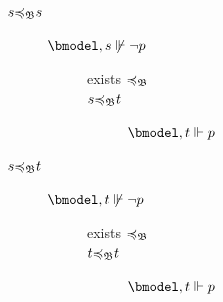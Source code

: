 \begin{example}
\begin{figure}
\begin{center}
{{\begin{minipage}[t]{.55\textwidth}
\begin{description}
\begin{description}
\begin{description}
                                \item[$s {\preccurlyeq_{\mathfrak{B}}} s$]\hfil
                                \begin{description}
                                        \item[$\nbforces s {\lnot p}$] \hfil
                                        \begin{description}
                                        \item[exists ${\preccurlyeq_{\mathfrak{B}}}$]
                                        \item[$s {\preccurlyeq_{\mathfrak{B}}} t$] \hfil
                                        \item[\quad] $\bforces t p$
                                        \end{description}
                                \end{description}
                                
                                \item[$s {\preccurlyeq_{\mathfrak{B}}} t$]\hfil
                                \begin{description}
                                        \item[$\nbforces t {\lnot p}$] \hfil
                                        \begin{description}
                                        \item[exists ${\preccurlyeq_{\mathfrak{B}}}$]
                                        \item[$t {\preccurlyeq_{\mathfrak{B}}} t$] \hfil
                                        \item[\quad] $\bforces t p$
                                        \end{description}
                                \end{description}
                                \end{description}
                        \end{description}

                        \end{description}
                \end{minipage}}
                \hfill
                }
\end{center}
\end{figure}
\end{example}
